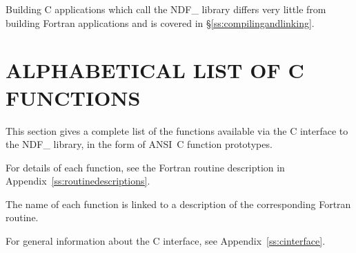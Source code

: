 Building C applications which call the NDF\_ library differs very
little from building Fortran applications and is covered in
\S\ref{ss:compilingandlinking}.

\newpage
\section{\label{ss:alphalistofcfunctions}ALPHABETICAL LIST OF C FUNCTIONS}

This section gives a complete list of the functions available via the
C interface to the NDF\_ library, in the form of ANSI~C function
prototypes.
\begin{latexonly}For details of each function, see the Fortran routine
description in Appendix~\ref{ss:routinedescriptions}.
\end{latexonly}
\begin{htmlonly}
The name of each function is linked to a description of the
corresponding Fortran routine.
\end{htmlonly}
For general information about the C interface, see
Appendix~\ref{ss:cinterface}.\\[1.0ex]

